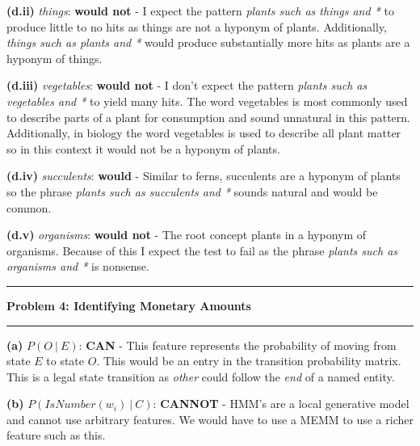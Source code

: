 \documentclass[11pt]{article}
\newcommand\question[2]{\vspace{.25in}\hrule\textbf{#1: #2}\vspace{.5em}\hrule\vspace{.10in}}
\renewcommand\part[1]{\vspace{.10in}\textbf{(#1)}}
\begin{document}
\part{d.ii} \textit{things}: \textbf{would not} - I expect the pattern \textit{plants such as things and *} to produce little to no hits as things are not a hyponym of plants. Additionally, \textit{things such as plants and *} would produce substantially more hits as plants are a hyponym of things.

\part{d.iii} \textit{vegetables}: \textbf{would not} - I don't expect the pattern \textit{plants such as vegetables and *} to yield many hits. The word vegetables is most commonly used to describe parts of a plant for consumption and sound unnatural in this pattern. Additionally, in biology the word vegetables is used to describe all plant matter so in this context it would not be a hyponym of plants.

\part{d.iv} \textit{succulents}: \textbf{would} - Similar to ferns, succulents are a hyponym of plants so the phrase \textit{plants such as succulents and *} sounds natural and would be common.

\part{d.v} \textit{organisms}: \textbf{would not} - The root concept plants in a hyponym of organisms. Because of this I expect the test to fail as the phrase \textit{plants such as organisms and *} is nonsense.

\question{Problem 4}{Identifying Monetary Amounts}

\part{a} $P(O \ | \ E)$: \textbf{CAN} - This feature represents the probability of moving from state $E$ to state $O$. This would be an entry in the transition probability matrix. This is a legal state transition as \textit{other} could follow the \textit{end} of a named entity.

\part{b} $P(IsNumber(w_i) \ | \ C)$: \textbf{CANNOT} - HMM's are a local generative model and cannot use arbitrary features. We would have to use a MEMM to use a richer feature such as this. 
\end{document}

